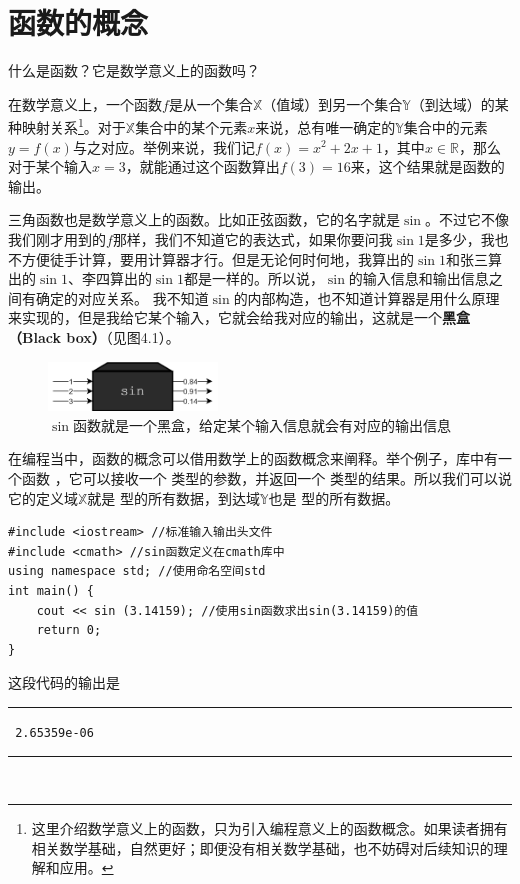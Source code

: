 \section{函数的概念}
什么是函数？它是数学意义上的函数吗？\par
在数学意义上，一个函数$f$是从一个集合$\mathbb{X}$（值域）到另一个集合$\mathbb{Y}$（到达域）的某种映射关系\footnote{这里介绍数学意义上的函数，只为引入编程意义上的函数概念。如果读者拥有相关数学基础，自然更好；即便没有相关数学基础，也不妨碍对后续知识的理解和应用。}。对于$\mathbb{X}$集合中的某个元素$x$来说，总有唯一确定的$\mathbb{Y}$集合中的元素$y=f(x)$与之对应。举例来说，我们记$f(x)=x^2+2x+1$，其中$x\in\mathbb{R}$，那么对于某个输入$x=3$，就能通过这个函数算出$f(3)=16$来，这个结果就是函数的输出。\par
三角函数也是数学意义上的函数。比如正弦函数，它的名字就是$\sin$。不过它不像我们刚才用到的$f$那样，我们不知道它的表达式，如果你要问我$\sin1$是多少，我也不方便徒手计算，要用计算器才行。但是无论何时何地，我算出的$\sin1$和张三算出的$\sin1$、李四算出的$\sin1$都是一样的。所以说，$\sin$的输入信息和输出信息之间有确定的对应关系。
我不知道$\sin$的内部构造，也不知道计算器是用什么原理来实现的，但是我给它某个输入，它就会给我对应的输出，这就是一个\textbf{黑盒（Black box）}（见图4.1）。\par
\begin{figure}[htbp]
    \centering
    \includegraphics[width=0.4\textwidth]{../images/generalized_parts/04_black_box.drawio.png}
    \caption{$\sin$函数就是一个黑盒，给定某个输入信息就会有对应的输出信息}
\end{figure}
在编程当中，函数的概念可以借用数学上的函数概念来阐释。举个例子，\lstinline@cmath@ 库中有一个函数 \lstinline@sin@，它可以接收一个 \lstinline@double@ 类型的参数，并返回一个 \lstinline@double@ 类型的结果。所以我们可以说它的定义域$\mathbb{X}$就是 \lstinline@double@ 型的所有数据，到达域$\mathbb{Y}$也是 \lstinline@double@ 型的所有数据。\par
\begin{lstlisting}
#include <iostream> //标准输入输出头文件
#include <cmath> //sin函数定义在cmath库中
using namespace std; //使用命名空间std
int main() {
    cout << sin (3.14159); //使用sin函数求出sin(3.14159)的值
    return 0;
}
\end{lstlisting}
这段代码的输出是\\\noindent\rule{\textwidth}{0.2pt}\texttt{
2.65359e-06
}\\\noindent\rule{\textwidth}{0.2pt}\\
